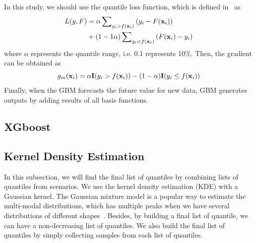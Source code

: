 \documentclass[journal]{IEEEtran} %
\begin{document}
In this study, we should use the quantile loss function, which is defined in~\cite{Ridgeway2012} as
\begin{equation}
\begin{aligned}
\label{QuantileLossFunction}
L(y,F)&  = \alpha \sum\nolimits_{{y_i} > f({{\bf{x}}_i})} {({y_i} - F({{\bf{x}}_i}))}  \\ &  + (1 - 1\alpha )\sum\nolimits_{{y_i} < f({{\bf{x}}_i})} {(F({{\bf{x}}_i}) - {y_i})}
\end{aligned}
\end{equation}
where $\alpha$ represents the quantile range, i.e. 0.1 represents 10\%. Then, the gradient can be obtained as
\begin{equation}
\label{QuantileGradient}
{g_m}({{\bf{x}}_i}) = \alpha {\bf{I}}({y_i} > f({{\bf{x}}_i})) - (1 - \alpha ){\bf{I}}({y_i} \le f({{\bf{x}}_i}))
\end{equation}
Finally, when the GBM forecasts the future value for new data, GBM generates outputs by adding results of all basis functions.
















\subsection{XGboost}

















\newpage
\subsection{Kernel Density Estimation}
In this subsection, we will find the final list of quantiles by combining lists of quantiles from scenarios. We use the kernel density estimation (KDE) with a Gaussian kernel. The Gaussian mixture model is a popular way to estimate the multi-modal distributions, which has multiple peaks when we have several distributions of different shapes~\cite{Haben2016}. Besides, by building a final list of quantile, we can have a non-decreasing list of quantiles. We also build the final list of quantiles by simply collecting samples from each list of quantiles. 
\end{document}
